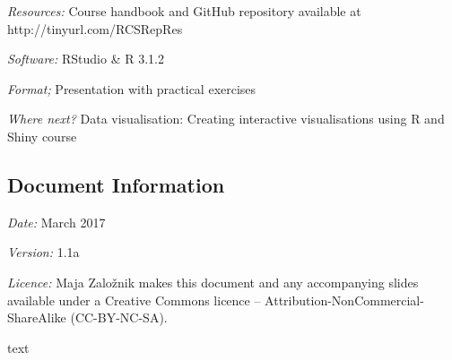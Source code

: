 \emph{Resources:}	Course handbook and GitHub repository available at http://tinyurl.com/RCSRepRes

\emph{Software:} RStudio \& 	R 3.1.2

\emph{Format;}	Presentation with practical exercises

\emph{Where next?}	Data visualisation: Creating interactive visualisations using R and Shiny course

\subsection*{Document Information}

\emph{Date:} March 2017

\emph{Version:} 1.1a

\emph{Licence:} Maja Zalo\v znik makes this document and any accompanying slides available under a Creative Commons licence – Attribution-NonCommercial- ShareAlike (CC-BY-NC-SA).


\newpage
{\color{white}text}

\newpage